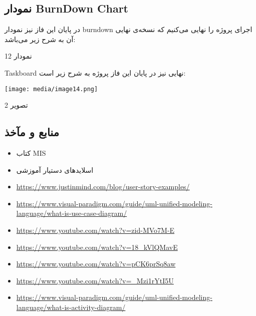 \documentclass[]{article}
\begin{document}
\subsection{نمودار BurnDown
Chart}\label{ux646ux645ux648ux62fux627ux631-burndown-chart}

در پایان این فاز نیز نمودار burndown اجرای پروژه را نهایی می‌کنیم که
نسخه‌ی نهایی آن به شرح زیر می‌باشد:

نمودار 12

Taskboard نهایی نیز در پایان این فاز پروژه به شرح زیر است:

\texttt{[image: media/image14.png]}

تصویر 2

\subsection{منابع و
مآخذ}\label{ux645ux646ux627ux628ux639-ux648-ux645ux622ux62eux630}

\begin{itemize}
\item
  کتاب MIS
\item
  اسلایدهای دستیار آموزشی
\end{itemize}

\begin{itemize}
\item
  \url{https://www.justinmind.com/blog/user-story-examples/}
\item
  \url{https://www.visual-paradigm.com/guide/uml-unified-modeling-language/what-is-use-case-diagram/}
\item
  \url{https://www.youtube.com/watch?v=zid-MVo7M-E}
\item
  \url{https://www.youtube.com/watch?v=18_kVlQMavE}
\item
  \url{https://www.youtube.com/watch?v=pCK6prSq8aw}
\item
  \url{https://www.youtube.com/watch?v=_Mzi1rYtI5U}
\item
  \url{https://www.visual-paradigm.com/guide/uml-unified-modeling-language/what-is-activity-diagram/}
\end{itemize}
\end{document}

